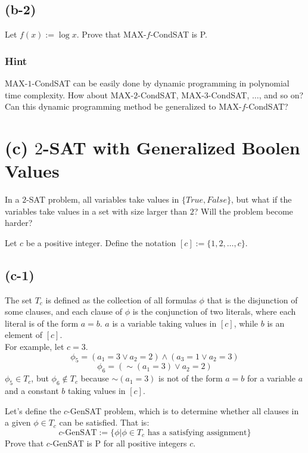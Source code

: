 \subsection*{(b-2)}

Let $f(x):=\log x$. Prove that MAX-$f$-CondSAT is P.

\subsubsection*{Hint}

MAX-$1$-CondSAT can be easily done by dynamic programming in polynomial time complexity. How about MAX-$2$-CondSAT, MAX-$3$-CondSAT, $\dots$, and so on? Can this dynamic programming method be generalized to MAX-$f$-CondSAT?

\section*{(c) $2$-SAT with Generalized Boolen Values}

In a $2$-SAT problem, all variables take values in $\{True, False\}$, but what if the variables take values in a set with size larger than $2$? Will the problem become harder?

Let $c$ be a positive integer. Define the notation $[c]:=\{1, 2, \dots, c\}$.

\subsection*{(c-1)}

The set $T_c$ is defined as the collection of all formulas $\phi$ that is the disjunction of some clauses, and each clause of $\phi$ is the conjunction of two literals, where each literal is of the form $a=b$. $a$ is a variable taking values in $[c]$, while $b$ is an element of $[c]$.\\
For example, let $c=3$.
$$\phi_5=(a_1=3\lor a_2=2)\land(a_3=1\lor a_2=3)$$
$$\phi_6=(\sim(a_1=3)\lor a_2=2)$$
$\phi_5\in T_c$, but $\phi_6\notin T_c$ because $\sim(a_1=3)$ is not of the form $a=b$ for a variable $a$ and a constant $b$ taking values in $[c]$.

Let's define the $c$-GenSAT problem, which is to determine whether all clauses in a given $\phi\in T_c$ can be satisfied. That is:
$$c\text{-GenSAT}:=\{\phi|\phi\in T_c\text{ has a satisfying assignment}\}$$
Prove that $c$-GenSAT is P for all positive integers $c$.


